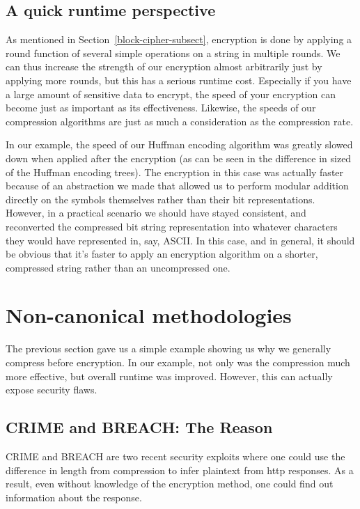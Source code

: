 \documentclass[11pt]{article}
\newcommand\genref{}
\newcommand\sectref{}
\def\genref#1#2{#1~\ref{#2}}
\def\sectref#1{\genref{Section}{#1}}
\begin{document}
\subsection{A quick runtime perspective}\label{runtime-subsect}
As mentioned in \sectref{block-cipher-subsect}, encryption is done by applying a round function of several simple operations 
on a string in multiple rounds. We can thus increase the strength of our encryption almost arbitrarily 
just by applying more rounds, but this has a serious runtime cost. Especially if you have a large amount of sensitive data to 
encrypt, the speed of your encryption can become just as important as its effectiveness. Likewise, the speeds of our 
compression algorithms are just as much a consideration as the compression rate.

In our example, the speed of our 
Huffman encoding algorithm was greatly slowed down when applied after the encryption (as can be seen in the difference in 
sized of the Huffman encoding trees). The encryption in this case was actually faster because of an abstraction we 
made that allowed us to perform modular addition directly on the symbols themselves rather than their bit representations. 
However, in a practical scenario we should have stayed consistent, and reconverted the compressed bit string 
representation into whatever characters they would have 
represented in, say, ASCII. In this case, and in general, it should be obvious that it's faster to apply 
an encryption algorithm on a shorter, compressed string rather than an uncompressed one. 

\section{Non-canonical methodologies}\label{non-canon-sect}
The previous section gave us a simple example showing us why we generally compress before encryption. 
In our example, not only was the compression much more effective, but overall runtime was improved. 
However, this can actually expose security flaws. 

\subsection{CRIME and BREACH: The Reason}\label{crime-breach-subsect}
CRIME and BREACH\cite{kelsey, gluck} are two recent security exploits where one could use the 
difference in length from compression to infer plaintext from http responses. As a result, even without 
knowledge of the encryption method, one could find out information about the response.
\end{document}
